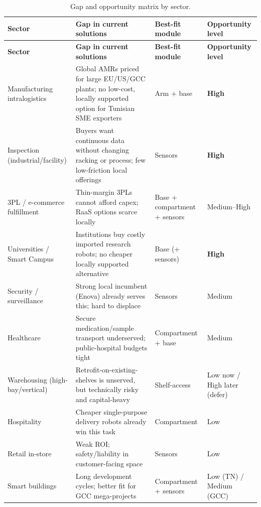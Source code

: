 {\small
\setlength{\tabcolsep}{4pt}
\renewcommand{\arraystretch}{1.3}
\begin{longtable}{|>{\raggedright\arraybackslash}m{3.3cm}|
                  >{\raggedright\arraybackslash}m{6cm}|
                  >{\raggedright\arraybackslash}m{2.4cm}|
                  >{\raggedright\arraybackslash}m{2.4cm}|}
\caption{Gap and opportunity matrix by sector.}\label{tab:gap}\\
\hline
\rowcolor{gray!15}
\textbf{Sector} & \textbf{Gap in current solutions} & \textbf{Best-fit module} & \textbf{Opportunity level} \\
\hline
\endfirsthead
\hline
\rowcolor{gray!15}
\textbf{Sector} & \textbf{Gap in current solutions} & \textbf{Best-fit module} & \textbf{Opportunity level} \\
\hline
\endhead
\hline
\endfoot
Manufacturing intralogistics & Global AMRs priced for large EU/US/GCC plants; no low-cost, locally supported option for Tunisian SME exporters & Arm + base & \textbf{High} \\
\hline
Inspection (industrial/facility) & Buyers want continuous data without changing racking or process; few low-friction local offerings & Sensors & \textbf{High} \\
\hline
3PL / e-commerce fulfillment & Thin-margin 3PLs cannot afford capex; RaaS options scarce locally & Base + compartment + sensors & Medium--High \\
\hline
Universities / Smart Campus & Institutions buy costly imported research robots; no cheaper locally supported alternative & Base (+ sensors) & \textbf{High} \\
\hline
Security / surveillance & Strong local incumbent (Enova) already serves this; hard to displace & Sensors & Medium \\
\hline
Healthcare & Secure medication/sample transport underserved; public-hospital budgets tight & Compartment + base & Medium \\
\hline
Warehousing (high-bay/vertical) & Retrofit-on-existing-shelves is unserved, but technically risky and capital-heavy & Shelf-access & Low now / High later (defer) \\
\hline
Hospitality & Cheaper single-purpose delivery robots already win this task & Compartment & Low \\
\hline
Retail in-store & Weak ROI; safety/liability in customer-facing space & Sensors & Low \\
\hline
Smart buildings & Long development cycles; better fit for GCC mega-projects & Compartment + sensors & Low (TN) / Medium (GCC) \\
\hline
\end{longtable}
}
